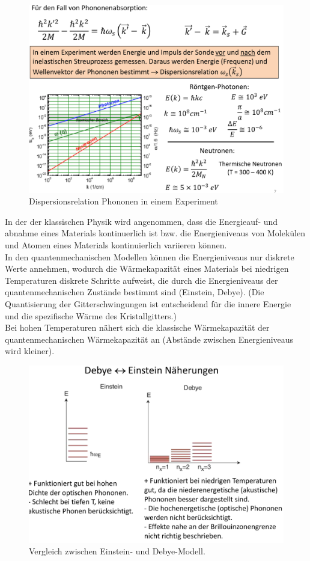 \begin{figure}[H]  
    \centering
    \includegraphics[width=.8\textwidth]{resources/05-01-2015/Frage6_2.png}
    \caption{Dispersionsrelation Phononen in einem Experiment}
\end{figure}

\label{q:7}

In der der klassischen Physik wird angenommen, dass die Energieauf- und abnahme eines Materials 
kontinuerlich ist bzw. die Energieniveaus von Molekülen und Atomen eines Materials kontinuierlich 
variieren können. \\
In den quantenmechanischen Modellen können die Energieniveaus nur diskrete Werte annehmen, wodurch die 
Wärmekapazität eines Materials bei niedrigen Temperaturen diskrete Schritte 
aufweist, die durch die Energieniveaus der quantenmechanischen Zustände bestimmt sind (Einstein, Debye).
(Die Quantisierung der Gitterschwingungen ist entscheidend für die innere Energie und
die spezifische Wärme des Kristallgitters.)
\\
Bei hohen Temperaturen nähert sich die klassische Wärmekapazität der quantenmechanischen Wärmekapazität 
an (Abstände zwischen Energieniveaus wird kleiner).

\begin{figure}[H]  
    \centering
    \includegraphics[width=.8\textwidth]{resources/05-01-2015/Frage7.png}
    \caption{Vergleich zwischen Einstein- und Debye-Modell.}
\end{figure}

